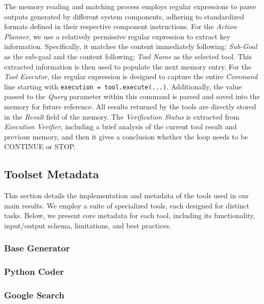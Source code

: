 The memory reading and matching process employs regular expressions to parse outputs generated by different system components, adhering to standardized formats defined in their respective component instructions. For the \textit{Action Planner}, we use a relatively permissive regular expression to extract key information. Specifically, it matches the content immediately following: \textit{Sub-Goal} as the sub-goal and the content following; \textit{Tool Name} as the selected tool. This extracted information is then used to populate the next memory entry. For the \textit{Tool Executor}, the regular expression is designed to capture the entire \textit{Command} line starting with \texttt{execution = tool.execute(...)}. Additionally, the value passed to the \textit{Query} parameter within this command is parsed and saved into the memory for future reference. All results returned by the tools are directly stored in the \textit{Result} field of the memory. The \textit{Verification Status} is extracted from \textit{Execution Verifier}, including a brief analysis of the current tool result and previous memory, and then it gives a conclusion whether the loop needs to be CONTINUE or STOP.
\vspace{-2mm}


\clearpage
\subsection{Toolset Metadata}
\label{app:tool_metadata}
This section details the implementation and metadata of the tools used in our main results.  We employ a suite of specialized tools, each designed for distinct tasks. Below, we present core metadata for each tool, including its functionality, input/output schema, limitations, and best practices.

\subsubsection{Base Generator}


\clearpage
\subsubsection{Python Coder}


\clearpage
\subsubsection{Google Search}



